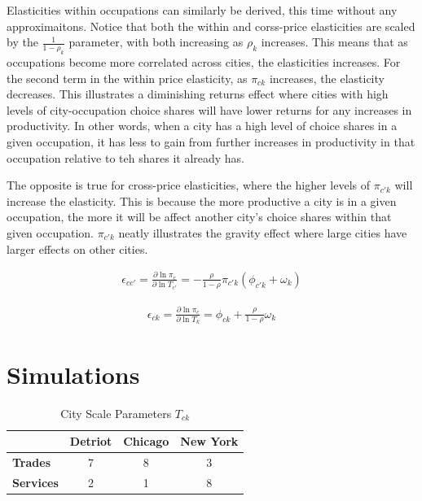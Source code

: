 \documentclass[10pt]{article}
\begin{document}
Elasticities within occupations can similarly be derived, this time without any approximaitons. Notice that both the within and corss-price elasticities are scaled by the $\frac{1}{1 - \rho_k}$ parameter, with both increasing as $\rho_k$ increases. This means that as occupations become more correlated across cities, the elasticities increases. For the second term in the within price elasticity, as $\pi_{ck}$ increases, the elasticity decreases. This illustrates a diminishing returns effect where cities with high levels of city-occupation choice shares will have lower returns for any increases in productivity. In other words, when a city has a high level of choice shares in a given occupation, it has less to gain from further increases in productivity in that occupation relative to teh shares it already has.

The opposite is true for cross-price elasticities, where the higher levels of $\pi_{c'k}$ will increase the elasticity. This is because the more productive a city is in a given occupation, the more it will be affect another city's choice shares within that given occupation. $\pi_{c'k}$ neatly illustrates the gravity effect where large cities have larger effects on other cities.

\begin{align}
    \epsilon_{cc'} = \frac{\partial \ln \pi_c}{\partial \ln T_{c'}} = - \frac{\rho}{1 - \rho} \pi_{c'k} (\phi_{c'k} + \omega_k)
    \label{city_elasticity}
\end{align}

\begin{align}
    \epsilon_{ck} = \frac{\partial \ln \pi_c}{\partial \ln T_k} = \phi_{ck} + \frac{\rho}{1 - \rho} \omega_k
    \label{occupation_elasticity}
\end{align}

\section{Simulations}

\begin{table}[h]
    \centering
    \begin{tabular}{|l|c|c|c|}
        \hline
                          & \textbf{Detriot} & \textbf{Chicago} & \textbf{New York} \\
        \hline
        \textbf{Trades}   & 7                & 8                & 3                 \\
        \hline
        \textbf{Services} & 2                & 1                & 8                 \\
        \hline
    \end{tabular}
    \caption{City Scale Parameters $T_{ck}$}
    \label{city_shifter}
\end{table}
\end{document}
